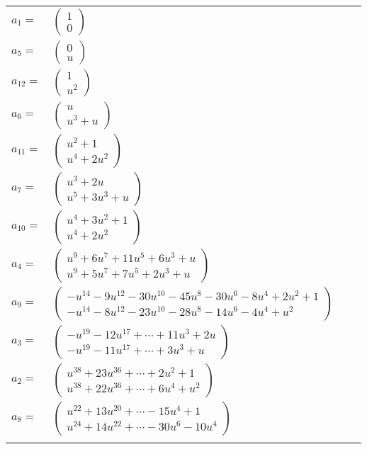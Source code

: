 \documentclass[1p]{elsarticle_modified}
\theoremstyle{definition}
\begin{document}
\begin{tabular}{m{7pt} m{180pt} m{7pt} m{180pt} }
\flushright $a_{1}=$&$\begin{pmatrix}1\\0\end{pmatrix}$ \\
\flushright $a_{5}=$&$\begin{pmatrix}0\\u\end{pmatrix}$ \\
\flushright $a_{12}=$&$\begin{pmatrix}1\\u^2\end{pmatrix}$ \\
\flushright $a_{6}=$&$\begin{pmatrix}u\\u^3+u\end{pmatrix}$ \\
\flushright $a_{11}=$&$\begin{pmatrix}u^2+1\\u^4+2 u^2\end{pmatrix}$ \\
\flushright $a_{7}=$&$\begin{pmatrix}u^3+2 u\\u^5+3 u^3+u\end{pmatrix}$ \\
\flushright $a_{10}=$&$\begin{pmatrix}u^4+3 u^2+1\\u^4+2 u^2\end{pmatrix}$ \\
\flushright $a_{4}=$&$\begin{pmatrix}u^9+6 u^7+11 u^5+6 u^3+u\\u^9+5 u^7+7 u^5+2 u^3+u\end{pmatrix}$ \\
\flushright $a_{9}=$&$\begin{pmatrix}- u^{14}-9 u^{12}-30 u^{10}-45 u^8-30 u^6-8 u^4+2 u^2+1\\- u^{14}-8 u^{12}-23 u^{10}-28 u^8-14 u^6-4 u^4+u^2\end{pmatrix}$ \\
\flushright $a_{3}=$&$\begin{pmatrix}- u^{19}-12 u^{17}+\cdots+11 u^3+2 u\\- u^{19}-11 u^{17}+\cdots+3 u^3+u\end{pmatrix}$ \\
\flushright $a_{2}=$&$\begin{pmatrix}u^{38}+23 u^{36}+\cdots+2 u^2+1\\u^{38}+22 u^{36}+\cdots+6 u^4+u^2\end{pmatrix}$ \\
\flushright $a_{8}=$&$\begin{pmatrix}u^{22}+13 u^{20}+\cdots-15 u^4+1\\u^{24}+14 u^{22}+\cdots-30 u^6-10 u^4\end{pmatrix}$\\&\end{tabular}
\end{document}
